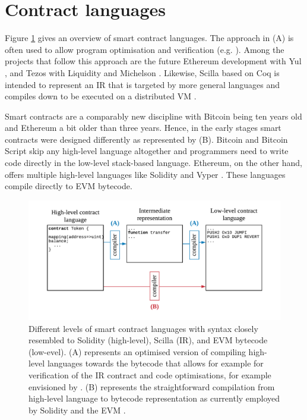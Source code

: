 \section{Contract languages}
\label{languages}

Figure \ref{fig:lang} gives an overview of smart contract languages.
The approach in (A) is often used to allow program optimisation and verification (e.g. \cite{Lattner2004}). 
Among the projects that follow this approach are the future Ethereum development with Yul \cite{EthereumFoundation2018IULIA}, and Tezos with Liquidity \cite{OCamlProSAS2018} and Michelson \cite{DynamicLedgerSolutions2017}.
Likewise, Scilla based on Coq is intended to represent an IR that is targeted by more general languages and compiles down to be executed on a distributed VM \cite{Sergey2018}.

Smart contracts are a comparably new discipline with Bitcoin being ten years old and Ethereum a bit older than three years.
Hence, in the early stages smart contracts were designed differently as represented by (B).
Bitcoin and Bitcoin Script \cite{BitcoinWiki2018Script} skip any high-level language altogether and programmers need to write code directly in the low-level stack-based language.
Ethereum, on the other hand, offers multiple high-level languages like Solidity \cite{Ethereum2018Solidity} and Vyper \cite{Ethereum2018Vyper}.
These languages compile directly to EVM bytecode. 

\begin{figure}
\label{fig:lang}
\includegraphics[width=\textwidth]{fig/Language.pdf}
\caption{Different levels of smart contract languages with syntax closely resembled to Solidity (high-level), Scilla (IR), and EVM bytecode (low-evel). (A) represents an optimised version of compiling high-level languages towards the bytecode that allows for example for verification of the IR contract and code optimisations, for example envisioned by \cite{Sergey2018,OCamlProSAS2018}. (B) represents the straightforward compilation from high-level language to bytecode representation as currently employed by Solidity and the EVM \cite{Ethereum2018Solidity,Wood2014}.}
\end{figure}


